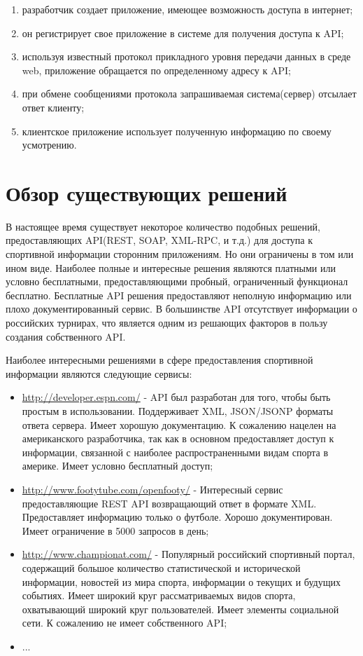 \begin{enumerate}
\item разработчик создает приложение, имеющее возможность доступа в интернет;
\item он регистрирует свое приложение в системе для получения доступа к API;
\item используя известный протокол прикладного уровня передачи данных в среде web, приложение обращается по определенному адресу к API;
\item при обмене сообщениями протокола запрашиваемая система(сервер) отсылает ответ клиенту;
\item клиентское приложение использует полученную информацию по своему усмотрению.
\end{enumerate}

\section{Обзор существующих решений}
В настоящее время существует некоторое количество подобных решений, предоставляющих API(REST, SOAP, XML-RPC, и т.д.) для доступа к спортивной информации сторонним приложениям.
Но они ограничены в том или ином виде. Наиболее полные и интересные решения являются платными или условно бесплатными, предоставляющими пробный, ограниченный функционал бесплатно. Бесплатные API решения предоставляют неполную информацию или плохо документированный сервис. В большинстве API отсутствует информации о российских турнирах, что является одним из решающих факторов в пользу создания собственного API.

Наиболее интересными решениями в сфере предоставления спортивной информации являются следующие сервисы:

\begin{itemize}
\item \url{http://developer.espn.com/} - API был разработан для того, чтобы быть простым в использовании. Поддерживает XML, JSON/JSONP форматы ответа сервера. Имеет хорошую документацию. К сожалению нацелен на американского разработчика, так как в основном предоставляет доступ к информации, связанной с наиболее распространенными видам спорта в америке. Имеет условно бесплатный доступ;
\item \url{http://www.footytube.com/openfooty/} - Интересный сервис предоставляющие REST API возвращающий ответ в формате XML. Предоставляет информацию только о футболе. Хорошо документирован. Имеет ограничение в 5000 запросов в день;
\item \url{http://www.championat.com/} - Популярный российский спортивный портал, содержащий большое количество статистической и исторической информации, новостей из мира спорта, информации о текущих и будущих событиях. Имеет широкий круг рассматриваемых видов спорта, охватывающий широкий круг пользователей. Имеет элементы социальной сети. К сожалению не имеет собственного API;
\item ...
\end{itemize}

